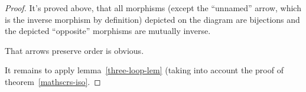 \begin{proof}
It's proved above, that all morphisms (except the ``unnamed'' arrow,
which is the inverse morphism by definition) depicted on the diagram
are bijections and the depicted ``opposite'' morphisms are mutually
inverse.

That arrows preserve order is obvious.

It remains to apply lemma~\ref{three-loop-lem} (taking into account the proof of theorem~\ref{mathscrs-iso}.
\end{proof}
